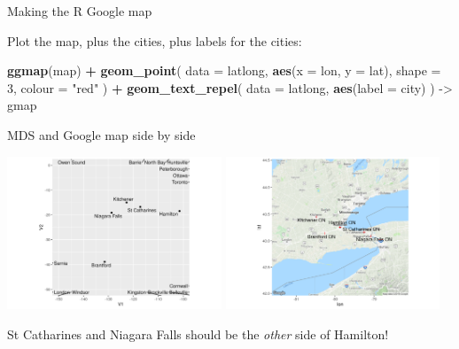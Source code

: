\documentclass[ignorenonframetext,]{beamer}
\newenvironment{Shaded}{\begin{snugshade}}{\end{snugshade}}
\newcommand{\DataTypeTok}[1]{\textcolor[rgb]{0.13,0.29,0.53}{#1}}
\newcommand{\DecValTok}[1]{\textcolor[rgb]{0.00,0.00,0.81}{#1}}
\newcommand{\KeywordTok}[1]{\textcolor[rgb]{0.13,0.29,0.53}{\textbf{#1}}}
\newcommand{\NormalTok}[1]{#1}
\newcommand{\OperatorTok}[1]{\textcolor[rgb]{0.81,0.36,0.00}{\textbf{#1}}}
\newcommand{\StringTok}[1]{\textcolor[rgb]{0.31,0.60,0.02}{#1}}
\begin{document}
\begin{frame}[fragile]{Making the R Google map}
\protect\hypertarget{making-the-r-google-map}{}

Plot the map, plus the cities, plus labels for the cities:

\begin{Shaded}
\begin{Highlighting}[]
\KeywordTok{ggmap}\NormalTok{(map) }\OperatorTok{+}
\StringTok{  }\KeywordTok{geom_point}\NormalTok{(}
    \DataTypeTok{data =}\NormalTok{ latlong,}
    \KeywordTok{aes}\NormalTok{(}\DataTypeTok{x =}\NormalTok{ lon, }\DataTypeTok{y =}\NormalTok{ lat),}
    \DataTypeTok{shape =} \DecValTok{3}\NormalTok{, }\DataTypeTok{colour =} \StringTok{"red"}
\NormalTok{  ) }\OperatorTok{+}
\StringTok{  }\KeywordTok{geom_text_repel}\NormalTok{(}
    \DataTypeTok{data =}\NormalTok{ latlong,}
    \KeywordTok{aes}\NormalTok{(}\DataTypeTok{label =}\NormalTok{ city)}
\NormalTok{  ) ->}\StringTok{ }\NormalTok{gmap}
\end{Highlighting}
\end{Shaded}

\end{frame}

\begin{frame}{MDS and Google map side by side}
\protect\hypertarget{mds-and-google-map-side-by-side}{}

\includegraphics[width=0.48\textwidth,height=\textheight]{g2.png}
\includegraphics[width=0.48\textwidth,height=\textheight]{gmap.png}

St Catharines and Niagara Falls should be the \emph{other} side of
Hamilton!

\end{frame}
\end{document}
